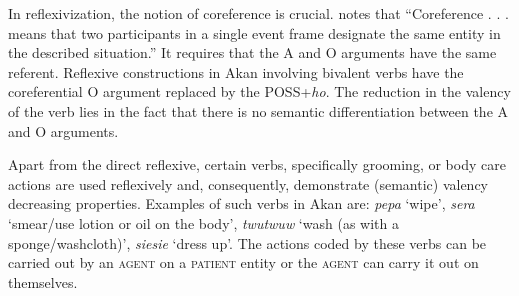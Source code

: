 \documentclass[output=paper]{langsci/langscibook}
\begin{document}
\ea
\label{ex:28.osam}
	\z

	\z
\z


In reflexivization, the notion of coreference is crucial. \citet[44]{kemmer1993} notes that ``Coreference . . .  means that two participants in a single event frame designate the same entity in the described situation.''  It requires that the A and O arguments have the same referent. Reflexive constructions in Akan involving bivalent verbs have the coreferential O argument replaced by the POSS+\textit{ho}.  The reduction in the valency of the verb lies in the fact that there is no semantic differentiation between the A and O arguments. 

Apart from the direct reflexive, certain verbs, specifically grooming, or body care actions \citep{kemmer1993} are used reflexively and, consequently, demonstrate (semantic) valency decreasing properties. Examples of such verbs in Akan are: \textit{pepa} `wipe', \textit{sera} `smear/use lotion or oil on the body', \textit{twutwuw} `wash (as with a sponge/washcloth)', \textit{siesie} `dress up'. The actions coded by these verbs can be carried out by an \textsc{agent} on a \textsc{patient} entity or the \textsc{agent} can carry it out on themselves. 

\ea
\label{ex:29.osam}
	\z

	\z
\z


\ea
\label{ex:30.osam}
	\z
\end{document}
